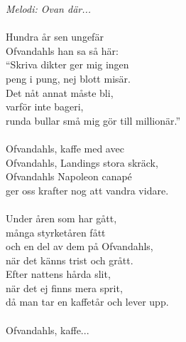 {\footnotesize\textit{Melodi: Ovan där...}}\\
\\
Hundra år sen ungefär\\
Ofvandahls han sa så här:\\
``Skriva dikter ger mig ingen\\
peng i pung, nej blott misär.\\
Det nåt annat måste bli,\\
varför inte bageri,\\
runda bullar små mig gör till millionär.''\\
\\
Ofvandahls, kaffe med avec\\
Ofvandahls, Landings stora skräck,\\
Ofvandahls Napoleon canapé\\
ger oss krafter nog att vandra vidare.\\
\\
Under åren som har gått,\\
många styrketåren fått\\
och en del av dem på Ofvandahls,\\
när det känns trist och grått.\\
Efter nattens hårda slit, \\
när det ej finns mera sprit,\\
då man tar en kaffetår och lever upp.\\
\\
Ofvandahls, kaffe...
